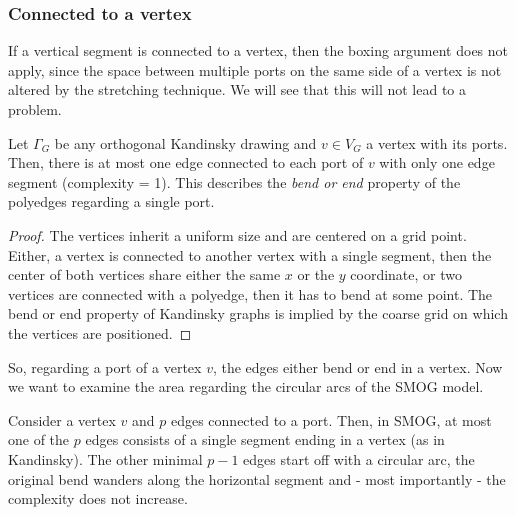 \subsubsection*{Connected to a vertex}
If a vertical segment is connected to a vertex, then the boxing argument does not apply, since the space between multiple ports on the same side of a vertex is not altered by the stretching technique. We will see that this will not lead to a problem.
\begin{lemma}
	Let $\Gamma_G$ be any orthogonal Kandinsky drawing and $v \in V_G$ a vertex with its ports. Then, there is at most one edge connected to each port of $v$ with only one edge segment (complexity = 1). This describes the \textit{bend or end} property of the polyedges regarding a single port.\label{lem:bend_or_end}
\end{lemma}
\begin{proof}
	The vertices inherit a uniform size and are centered on a grid point. Either, a vertex is connected to another vertex with a single segment, then the center of both vertices share either the same $x$ or the $y$ coordinate, or two vertices are connected with a polyedge, then it has to bend at some point. The bend or end property of Kandinsky graphs is implied by the coarse grid on which the vertices are positioned. 
\end{proof}
So, regarding a port of a vertex $v$, the edges either bend or end in a vertex. Now we want to examine the area regarding the circular arcs of the SMOG model.
\begin{lemma}
	Consider a vertex $v$ and $p$ edges connected to a port. Then, in SMOG, at most one of the $p$ edges consists of a single segment ending in a vertex (as in Kandinsky). The other minimal $p-1$ edges start off with a circular arc, the original bend wanders along the horizontal segment and - most importantly - the complexity does not increase.\label{lem:Kandinsky_bend}
\end{lemma}
